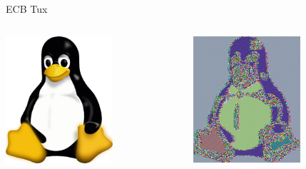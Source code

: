 \begin{frame}{ECB Tux}
  \begin{columns}
    \begin{column}{0.5\textwidth}
      \begin{center}
        \includegraphics[width=150px]{tux}
      \end{center}
    \end{column}
    \begin{column}{0.5\textwidth}
      \pause
      \begin{center}
        \includegraphics[width=150px]{tux_ecb}
      \end{center}
    \end{column}
  \end{columns}
\end{frame}

